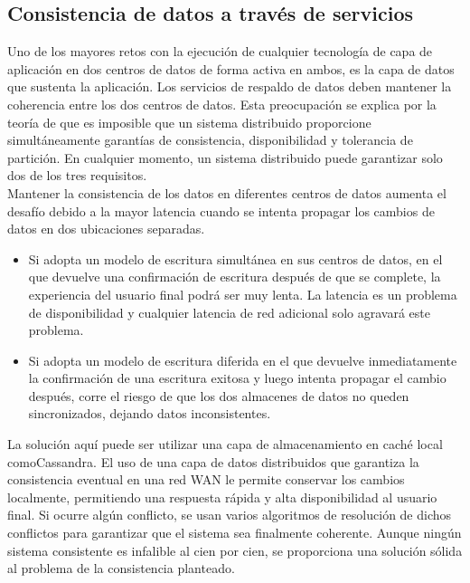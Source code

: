 \documentclass[a4paper,11pt]{article}
\begin{document}
\subsection{Consistencia de datos a través de servicios}
Uno de los mayores retos con la ejecución de cualquier tecnología de capa de aplicación en dos centros de datos de forma activa en ambos, es la capa de datos que sustenta la aplicación. Los servicios de respaldo de datos deben mantener la coherencia entre los dos centros de datos. Esta preocupación se explica por la teoría de que es imposible que un sistema distribuido proporcione simultáneamente garantías de consistencia, disponibilidad y tolerancia de partición. En cualquier momento, un sistema distribuido puede garantizar solo dos de los tres requisitos.\\
Mantener la consistencia de los datos en diferentes centros de datos aumenta el desafío debido a la mayor latencia cuando se intenta propagar los cambios de datos en dos ubicaciones separadas.
\begin{itemize}
  \item Si adopta un modelo de escritura simultánea en sus centros de datos, en el que devuelve una confirmación de escritura después de que se complete, la experiencia del usuario final podrá ser muy lenta. La latencia es un problema de disponibilidad y cualquier latencia de red adicional solo agravará este problema.
  \item Si adopta un modelo de escritura diferida en el que devuelve inmediatamente la confirmación de una escritura exitosa y luego intenta propagar el cambio después, corre el riesgo de que los dos almacenes de datos no queden sincronizados, dejando datos inconsistentes.
\end{itemize}
La solución aquí puede ser utilizar una capa de almacenamiento en caché local comoCassandra. El uso de una capa de datos distribuidos que garantiza la consistencia eventual en una red WAN le permite conservar los cambios localmente, permitiendo una respuesta rápida
y alta disponibilidad al usuario final. Si ocurre algún conflicto, se usan varios algoritmos de resolución de dichos conflictos para garantizar que el sistema sea finalmente coherente. Aunque ningún sistema consistente es infalible al cien por cien, se proporciona una solución sólida al problema de la consistencia planteado.
\end{document}
